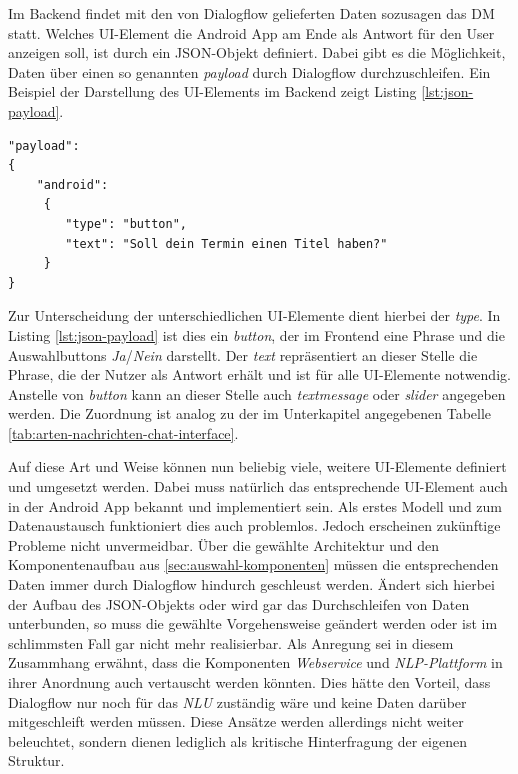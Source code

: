 Im Backend findet mit den von Dialogflow gelieferten Daten sozusagen das \acl{DM} statt. Welches \ac{UI}-Element die Android App am Ende als Antwort für den User anzeigen soll, ist durch ein \ac{JSON}-Objekt definiert. Dabei gibt es die Möglichkeit, Daten über einen so genannten \textit{payload} durch Dialogflow durchzuschleifen. Ein Beispiel der Darstellung des \ac{UI}-Elements im Backend zeigt Listing \ref{lst:json-payload}.
\newline

\begin{lstlisting}[caption={Darstellung des \acs{UI}-Elements im Backend im \acs{JSON}-Format}, captionpos=b, label={lst:json-payload}, language=myjson]
"payload": 
{
    "android": 
	 {
        "type": "button",
        "text": "Soll dein Termin einen Titel haben?"
	 }
}
\end{lstlisting}

Zur Unterscheidung der unterschiedlichen \ac{UI}-Elemente dient hierbei der \textit{type}. In Listing \ref{lst:json-payload} ist dies ein \textit{button}, der im Frontend eine Phrase und die Auswahlbuttons \textit{Ja}/\textit{Nein} darstellt. Der \textit{text} repräsentiert an dieser Stelle die Phrase, die der Nutzer als Antwort erhält und ist für alle \ac{UI}-Elemente notwendig. Anstelle von \textit{button} kann an dieser Stelle auch \textit{textmessage} oder \textit{slider} angegeben werden. Die Zuordnung ist analog zu der im Unterkapitel  angegebenen Tabelle \ref{tab:arten-nachrichten-chat-interface}.

Auf diese Art und Weise können nun beliebig viele, weitere \ac{UI}-Elemente definiert und umgesetzt werden. Dabei muss natürlich das entsprechende \ac{UI}-Element auch in der Android App bekannt und implementiert sein. Als erstes Modell und zum Datenaustausch funktioniert dies auch problemlos. Jedoch erscheinen zukünftige Probleme nicht unvermeidbar. Über die gewählte Architektur und den Komponentenaufbau aus \ref{sec:auswahl-komponenten} müssen die entsprechenden Daten immer durch Dialogflow hindurch geschleust werden. Ändert sich hierbei der Aufbau des \ac{JSON}-Objekts oder wird gar das Durchschleifen von Daten unterbunden, so muss die gewählte Vorgehensweise geändert werden oder ist im schlimmsten Fall gar nicht mehr realisierbar. Als Anregung sei in diesem Zusammhang erwähnt, dass die Komponenten \textit{Webservice} und \textit{\ac{NLP}-Plattform} in ihrer Anordnung auch vertauscht werden könnten. Dies hätte den Vorteil, dass Dialogflow nur noch für das \textit{\acl{NLU}} zuständig wäre und keine Daten darüber mitgeschleift werden müssen. Diese Ansätze werden allerdings nicht weiter beleuchtet, sondern dienen lediglich als kritische Hinterfragung der eigenen Struktur.

